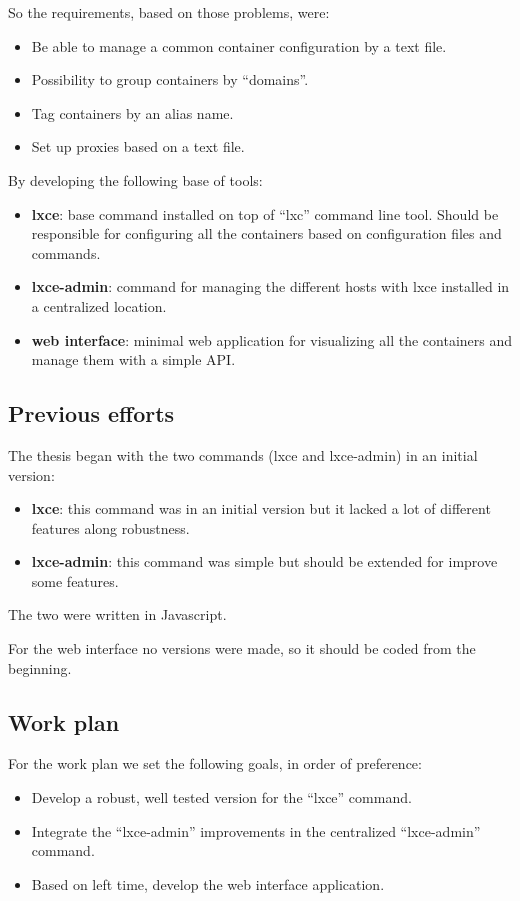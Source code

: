 So the requirements, based on those problems, were:
\begin{itemize}
	\item {Be able to manage a common container configuration by a text file.}
	\item {Possibility to group containers by ``domains''.}
	\item {Tag containers by an alias name.}
	\item {Set up proxies based on a text file.}
\end{itemize}

By developing the following base of tools:
\begin{itemize}
	\item {\textbf{lxce}: base command installed on top of ``lxc'' command line tool. Should be responsible for configuring all the containers based on configuration files and commands.}
	\item {\textbf{lxce-admin}: command for managing the different hosts with lxce installed in a centralized location.}
	\item {\textbf{web interface}: minimal web application for visualizing all the containers and manage them with a simple API.}
\end{itemize}


\subsection{Previous efforts}
\label{ssec:previous}
The thesis began with the two commands (lxce and lxce-admin) in an initial version:
\begin{itemize}
	\item {\textbf{lxce}: this command was in an initial version but it lacked a lot of different features along robustness.}
	\item {\textbf{lxce-admin}: this command was simple but should be extended for improve some features.}
\end{itemize}
The two were written in Javascript.

For the web interface no versions were made, so it should be coded from the beginning.

\subsection{Work plan}
\label{ssec:gantt}
For the work plan we set the following goals, in order of preference:
\begin{itemize}
	\item {Develop a robust, well tested version for the ``lxce'' command.}
	\item {Integrate the ``lxce-admin'' improvements in the centralized ``lxce-admin'' command.}
	\item {Based on left time, develop the web interface application.}
\end{itemize}

